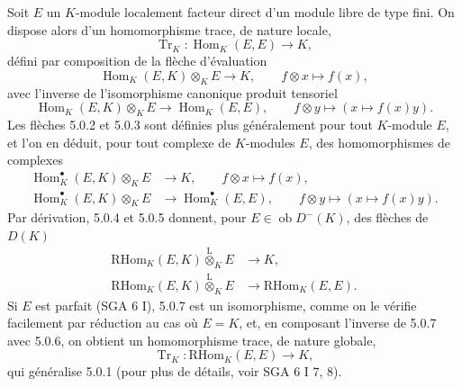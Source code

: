 \documentclass[11pt]{article}
\DeclareMathOperator{\Hom}{Hom}
\newcommand{\ob}{\operatorname{ob}}
\providecommand{\RHom}{\mathrm{RHom}}
\providecommand{\Tr}{\operatorname{Tr}}
\providecommand{\Tr}{\operatorname{Tr}}
\providecommand{\lten}{\overset{\mathrm L}{\otimes}}
\providecommand{\Tr}{\operatorname{Tr}}
\providecommand{\RHom}{\mathrm{RHom}}
\providecommand{\Hom}{\operatorname{Hom}}
\providecommand{\ob}{\operatorname{ob}}
\providecommand{\lten}{\overset{\mathrm L}{\otimes}}
\providecommand{\RHom}{\mathrm R\mathcal{H}om}
\providecommand{\lten}{\overset{\mathrm L}{\otimes}}
\providecommand{\Tr}{\operatorname{Tr}}
\providecommand{\lten}{\overset{\mathrm L}{\otimes}}
\providecommand{\lten}{\overset{\mathrm L}{\otimes}}
\providecommand{\lten}{\overset{\mathrm L}{\otimes}}
\begin{document}
Soit $E$ un $K$-module localement facteur direct d'un module libre de type fini. On dispose alors d'un homomorphisme trace, de nature locale,
\begin{equation}\tag{5.0.1}
\Tr_K:\Hom_K(E,E)\longrightarrow K,
\end{equation}
défini par composition de la flèche d'évaluation
\begin{equation}\tag{5.0.2}
\Hom_K(E,K)\otimes_KE\longrightarrow K,\qquad f\otimes x\longmapsto f(x),
\end{equation}
avec l'inverse de l'isomorphisme canonique produit tensoriel
\begin{equation}\tag{5.0.3}
\Hom_K(E,K)\otimes_KE\longrightarrow\Hom_K(E,E),\qquad f\otimes y\longmapsto (x\longmapsto f(x)y).
\end{equation}
Les flèches 5.0.2 et 5.0.3 sont définies plus généralement pour tout $K$-module $E$, et l'on en déduit, pour tout complexe de $K$-modules $E$, des homomorphismes de complexes
\begin{align}
\Hom_K^\bullet(E,K)\otimes_KE&\longrightarrow K,\qquad f\otimes x\longmapsto f(x),\tag{5.0.4}\\
\Hom_K^\bullet(E,K)\otimes_KE&\longrightarrow \Hom_K^\bullet(E,E),\qquad f\otimes y\longmapsto (x\longmapsto f(x)y).\tag{5.0.5}
\end{align}
Par dérivation, 5.0.4 et 5.0.5 donnent, pour $E\in\ob D^-(K)$, des flèches de $D(K)$
\begin{align}
\RHom_K(E,K)\lten_KE&\longrightarrow K,\tag{5.0.6}\\
\RHom_K(E,K)\lten_KE&\longrightarrow\RHom_K(E,E).\tag{5.0.7}
\end{align}
Si $E$ est parfait (SGA 6 I), 5.0.7 est un isomorphisme, comme on le vérifie facilement par réduction au cas où $E=K$, et, en composant l'inverse de 5.0.7 avec 5.0.6, on obtient un homomorphisme trace, de nature globale,
\begin{equation}\tag{5.0.8}
\Tr_K:\RHom_K(E,E)\longrightarrow K,
\end{equation}
qui généralise 5.0.1 (pour plus de détails, voir SGA 6 I 7, 8).
\end{document}
